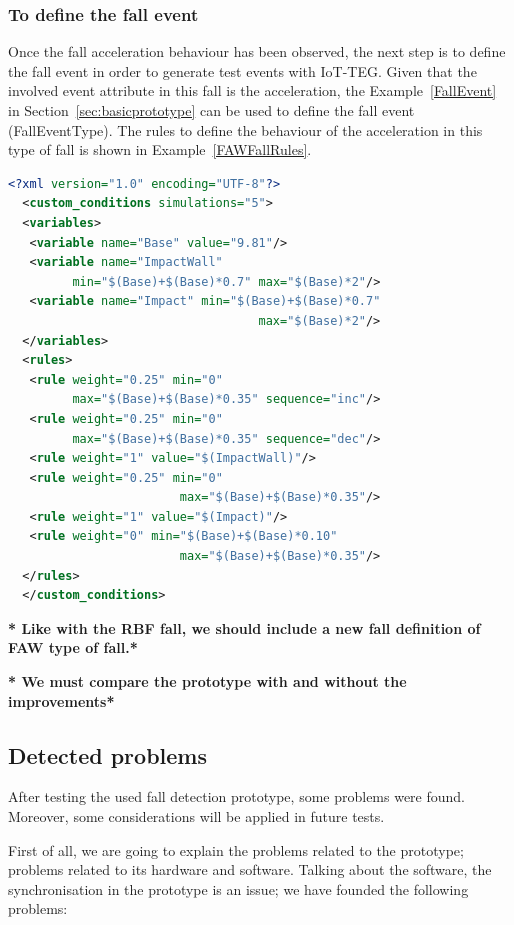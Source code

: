 \documentclass[conference]{IEEEtran}
\theoremstyle{definition}
\begin{document}
\subsubsection*{To define the fall event} Once the fall acceleration behaviour has been observed, the next step is to define the 
fall event in order to generate test events with IoT-TEG. Given that the involved event attribute in this fall is the acceleration, 
the Example~\ref{FallEvent} in Section~\ref{sec:basicprototype} can be used to define the fall event (FallEventType). The rules to
define the behaviour of the acceleration in this type of fall is shown in Example~\ref{FAWFallRules}.

\begin{lstlisting}[basicstyle=\ttfamily\footnotesize,language=XML,caption={Rules to define a FAW fall},label=FAWFallRules]
  <?xml version="1.0" encoding="UTF-8"?>
  <custom_conditions simulations="5">
  <variables>
   <variable name="Base" value="9.81"/>
   <variable name="ImpactWall" 
         min="$(Base)+$(Base)*0.7" max="$(Base)*2"/>
   <variable name="Impact" min="$(Base)+$(Base)*0.7" 
                                   max="$(Base)*2"/>
  </variables>
  <rules>
   <rule weight="0.25" min="0" 
         max="$(Base)+$(Base)*0.35" sequence="inc"/>
   <rule weight="0.25" min="0" 
         max="$(Base)+$(Base)*0.35" sequence="dec"/>
   <rule weight="1" value="$(ImpactWall)"/>
   <rule weight="0.25" min="0" 
                        max="$(Base)+$(Base)*0.35"/>
   <rule weight="1" value="$(Impact)"/>
   <rule weight="0" min="$(Base)+$(Base)*0.10" 
                        max="$(Base)+$(Base)*0.35"/>
  </rules>
  </custom_conditions>
\end{lstlisting}

\textbf{* Like with the RBF fall, we should include a new fall definition of FAW type of fall.*}

\textbf{* We must compare the prototype with and without the improvements*}

\subsection{Detected problems}
\label{sub:detectedproblems}

After testing the used fall detection prototype, some problems were 
found. Moreover, some considerations will be applied in future tests.

First of all, we are going to explain the problems related to the prototype; problems related to its hardware and
software. Talking about the software, the synchronisation in the prototype is an issue; we have founded the following problems:
\end{document}
